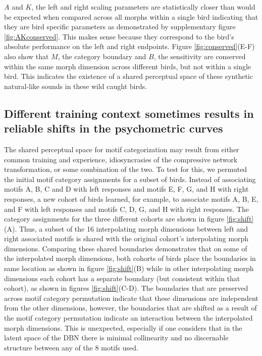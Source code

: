 $A$ and $K$, the left and right scaling parameters are statistically closer than would be expected when compared across all morphs within a single bird indicating that they are bird specific parameters as demonstrated by supplementary figure \ref{fig:AKconserved}. This makes sense because they correspond to the bird's absolute performance on the left and right endpoints. Figure \ref{fig:conserved}(E-F) also show that $M$, the category boundary and $B$, the sensitivity are conserved within the same morph dimension across different birds, but not within a single bird. This indicates the existence of a shared perceptual space of these synthetic natural-like sounds in these wild caught birds. 

\subsection{Different training context sometimes results in reliable shifts in the psychometric curves}



The shared perceptual space for motif categorization may result from either common training and experience, idiosyncrasies of the compressive network transformation, or some combination of the two. To test for this, we permuted the initial motif category assignments for a subset of birds. Instead of associating motifs A, B, C and D with left responses and motifs E, F, G, and H with right responses, a new cohort of birds learned, for example, to associate motifs A, B, E, and F with left responses and motifs C, D, G, and H with right responses. The category assignments for the three different cohorts are shown in figure \ref{fig:shift}(A). Thus, a subset of the 16 interpolating morph dimensions between left and right associated motifs is shared with the original cohort's interpolating morph dimensions. Comparing these shared boundaries demonstrates that on some of the interpolated morph dimensions, both cohorts of birds place the boundaries in same location as shown in figure \ref{fig:shift}(B) while in other interpolating morph dimensions each cohort has a separate boundary (but consistent within that cohort), as shown in figures \ref{fig:shift}(C-D). The boundaries that are preserved across motif category permutation indicate that these dimensions are independent from the other dimensions, however, the boundaries that are shifted as a result of the motif category permutation indicate an interaction between the interpolated morph dimensions. This is unexpected, especially if one considers that in the latent space of the DBN there is minimal collinearity and no discernable structure between any of the 8 motifs used.


